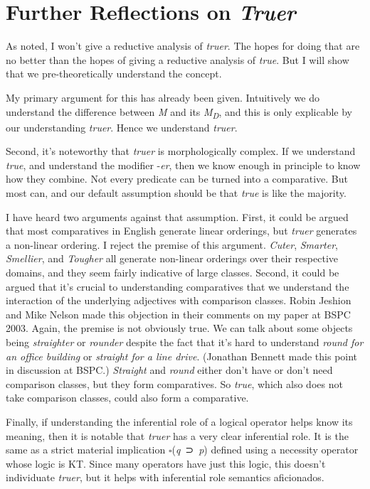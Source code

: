 \documentclass[
  10pt,
  letterpaper,
  DIV=11,
  numbers=noendperiod,
  twoside]{scrartcl}
\begin{document}
\section{\texorpdfstring{Further Reflections on
\emph{Truer}}{Further Reflections on Truer}}\label{further-reflections-on-truer}

As noted, I won't give a reductive analysis of \emph{truer}. The hopes
for doing that are no better than the hopes of giving a reductive
analysis of \emph{true}. But I will show that we pre-theoretically
understand the concept.

My primary argument for this has already been given. Intuitively we do
understand the difference between \emph{M} and its
\emph{M\textsubscript{D}}, and this is only explicable by our
understanding \emph{truer}. Hence we understand \emph{truer}.

Second, it's noteworthy that \emph{truer} is morphologically complex. If
we understand \emph{true}, and understand the modifier -\emph{er}, then
we know enough in principle to know how they combine. Not every
predicate can be turned into a comparative. But most can, and our
default assumption should be that \emph{true} is like the majority.

I have heard two arguments against that assumption. First, it could be
argued that most comparatives in English generate linear orderings, but
\emph{truer} generates a non-linear ordering. I reject the premise of
this argument. \emph{Cuter}, \emph{Smarter}, \emph{Smellier}, and
\emph{Tougher} all generate non-linear orderings over their respective
domains, and they seem fairly indicative of large classes. Second, it
could be argued that it's crucial to understanding comparatives that we
understand the interaction of the underlying adjectives with comparison
classes. Robin Jeshion and Mike Nelson made this objection in their
comments on my paper at BSPC 2003. Again, the premise is not obviously
true. We can talk about some objects being \emph{straighter} or
\emph{rounder} despite the fact that it's hard to understand \emph{round
for an office building} or \emph{straight for a line drive}. (Jonathan
Bennett made this point in discussion at BSPC.) \emph{Straight} and
\emph{round} either don't have or don't need comparison classes, but
they form comparatives. So \emph{true}, which also does not take
comparison classes, could also form a comparative.

Finally, if understanding the inferential role of a logical operator
helps know its meaning, then it is notable that \emph{truer} has a very
clear inferential role. It is the same as a strict material implication
\(\square\)(\emph{q}~⊃~\emph{p}) defined using a necessity operator
whose logic is KT. Since many operators have just this logic, this
doesn't individuate \emph{truer}, but it helps with inferential role
semantics aficionados.
\end{document}
